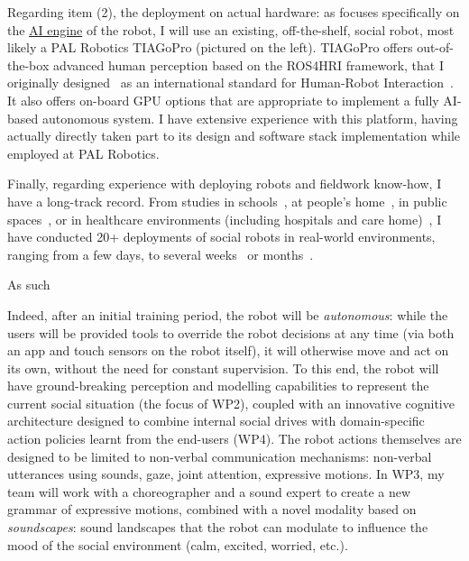 Regarding item (2), the deployment on actual hardware: as \project focuses specifically on the
\ul{AI engine} of the robot, I will use an existing, off-the-shelf, social
robot, most likely a PAL Robotics TIAGoPro (pictured on the left). TIAGoPro offers
out-of-the-box advanced human perception based on the ROS4HRI framework, that I
originally designed~\autocite{mohamed2021ros4hri} as an international standard for
Human-Robot Interaction~\autocite{lemaignan2022ros}. It also offers on-board GPU
options that are appropriate to implement a fully AI-based autonomous system.
I have extensive experience with this platform, having actually directly taken part to
its design and software stack implementation while employed at PAL Robotics.

Finally, regarding experience with deploying robots and fieldwork know-how, I
have a long-track record. From studies in
schools~\cite{hood2015when, lemaignan2016learning, jacq2016building,
baxter2015wider,kennedy2016cautious,senft2018robots,lemaignan2022social},
at people's home~\cite{mondada2015ranger}, in public
spaces~\cite{alhafnawi2022deliberative}, or in healthcare environments
(including hospitals and care home)~\cite{winkle2020couch,cooper2023challenges}, I have conducted 20+
deployments of social robots in real-world environments, ranging from a few
days, to several weeks~\cite{jacq2016building,lemaignan2022social} or
months~\cite{winkle2020couch}.

As such

Indeed,
after an initial training period, the robot will be \emph{autonomous}: while the
users will be provided tools to override the robot decisions at any time (via
both an app and touch sensors on the robot itself), it will otherwise move and
act on its own, without the need for constant supervision. To this end, the
robot will have ground-breaking perception and modelling capabilities to
represent the current social situation (the focus of WP2), coupled with an
innovative cognitive architecture designed to combine internal social drives
with domain-specific action policies learnt from the end-users (WP4). The robot
actions themselves are designed to be limited to non-verbal communication
mechanisms: non-verbal utterances using sounds, gaze, joint attention,
expressive motions. In WP3, my team will work with a choreographer and a sound
expert to create a new grammar of expressive motions, combined with a novel
modality based on \emph{soundscapes}: sound landscapes that the robot can
modulate to influence the mood of the social environment (calm, excited,
worried, etc.).

